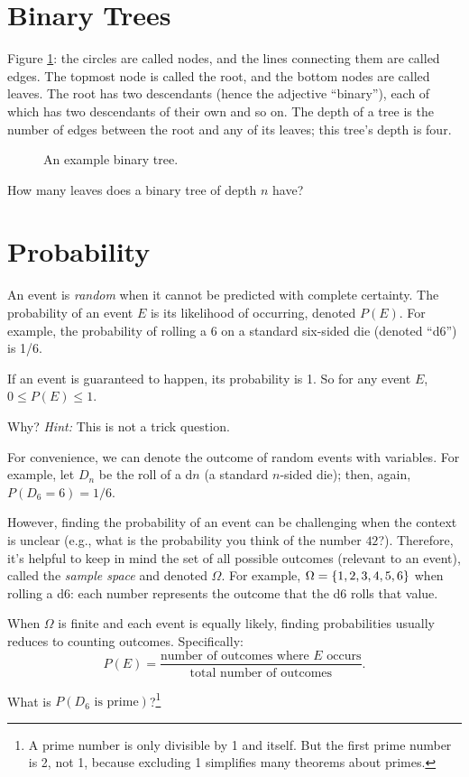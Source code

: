 \documentclass{book}
\begin{document}
\section{Binary Trees}
Figure \ref{tree}: the circles are called nodes, and the lines connecting them are called edges. The topmost node is called the root, and the bottom nodes are called leaves. The root has two descendants (hence the adjective ``binary''), each of which has two descendants of their own and so on. The depth of a tree is the number of edges between the root and any of its leaves; this tree's depth is four.

\begin{figure}[ht]
\centering

\caption{An example binary tree.}
\label{tree}
\end{figure}
\begin{exercise}
How many leaves does a binary tree of depth $n$ have?
\end{exercise}

\section{Probability}
An event is \emph{random} when it cannot be predicted with complete certainty. The probability of an event $E$ is its likelihood of occurring, denoted $P(E)$. For example, the probability of rolling a 6 on a standard six-sided die (denoted ``d6'') is 1/6.

If an event is guaranteed to happen, its probability is 1. So for any event $E$, $0 \leq P(E) \leq 1$.
\begin{exercise}
Why? \emph{Hint:} This is not a trick question.
\end{exercise}
For convenience, we can denote the outcome of random events with variables. For example, let $D_n$ be the roll of a d$n$ (a standard $n$-sided die); then, again, $P(D_6 = 6) = 1/6$.

However, finding the probability of an event can be challenging when the context is unclear (e.g., what is the probability you think of the number $42$?). Therefore, it's helpful to keep in mind the set of all possible outcomes (relevant to an event), called the \emph{sample space} and denoted $\Omega$. For example, $\Omega = \{1, 2, 3, 4, 5, 6\}$ when rolling a d6: each number represents the outcome that the d6 rolls that value.

When $\Omega$ is finite and each event is equally likely, finding probabilities usually reduces to counting outcomes. Specifically:
\begin{equation}\label{countprob}
P(E) = \frac{\text{number of outcomes where $E$ occurs}}{\text{total number of outcomes}}.
\end{equation}
\begin{exercise}
What is $P(D_6 \text{ is prime})$?\footnote{A prime number is only divisible by 1 and itself. But the first prime number is 2, not 1, because excluding 1 simplifies many theorems about primes.}
\end{exercise}
\end{document}
